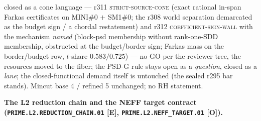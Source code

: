 \documentclass[11pt,a4paper]{article}
\begin{document}
{{closed as a cone language} --- r311 \textsc{strict-source-cone}
(exact rational in-span Farkas certificates on MINI\#0 $+$ SM1\#0;
the r308 world separation demarcated as the budget sign / a
chordal restatement) and r312 \textsc{coefficient-sign-wall} with
the mechanism \emph{named} (block-psd membership without
rank-one-SDD membership, obstructed at the budget/border sign;
Farkas mass on the border/budget row, $t$-share $0.583/0.725$) ---
no GO per the reviewer tree, the resources moved to the fiber; the
PSD-G rule stays open as a \emph{question}, closed as a
\emph{lane}; the closed-functional demand itself is untouched (the
sealed r295 bar stands).
Mincut base 4 / refined 5 unchanged; no RH statement.\par}

\par\smallskip\noindent\textbf{The L2 reduction chain and the NEFF
target contract (\texttt{PRIME.L2.\allowbreak REDUCTION\_CHAIN.01}
[E], \texttt{PRIME.L2.\allowbreak NEFF\_TARGET.01} [O]).}
\end{document}

